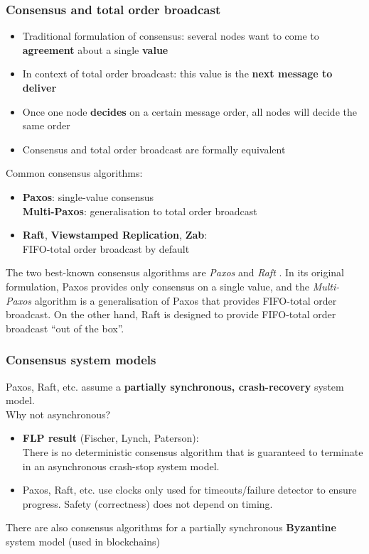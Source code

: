 \begin{frame}
    \label{s:consensus-intro}
    \frametitle{Consensus and total order broadcast}
    \begin{itemize}
        \item Traditional formulation of consensus: several nodes want to come to \textbf{agreement} about a single \textbf{value}\pause
        \item In context of total order broadcast: this value is the \textbf{next message to deliver}\pause
        \item Once one node \textbf{decides} on a certain message order, all nodes will decide the same order\pause
        \item Consensus and total order broadcast are formally equivalent\pause
    \end{itemize}
    Common consensus algorithms:
    \begin{itemize}
        \item \textbf{Paxos}: single-value consensus\\
            \textbf{Multi-Paxos}: generalisation to total order broadcast\pause
        \item \textbf{Raft}, \textbf{Viewstamped Replication}, \textbf{Zab}:\\
            FIFO-total order broadcast by default
    \end{itemize}
\end{frame}
\label{l:consensus-intro}

The two best-known consensus algorithms are \emph{Paxos} \citep{Lamport:1998} and \emph{Raft} \citep{Ongaro:2014}.
In its original formulation, Paxos provides only consensus on a single value, and the \emph{Multi-Paxos} algorithm is a generalisation of Paxos that provides FIFO-total order broadcast.
On the other hand, Raft is designed to provide FIFO-total order broadcast ``out of the box''.

\begin{frame}
    \label{s:consensus-model}
    \frametitle{Consensus system models}
    Paxos, Raft, etc. assume a \textbf{partially synchronous, crash-recovery} system model.\\[1em]\pause
    Why not asynchronous?
    \begin{itemize}
        \item \textbf{FLP result} (Fischer, Lynch, Paterson):\\
            There is no deterministic consensus algorithm that is guaranteed to terminate in an asynchronous crash-stop system model.\pause
        \item Paxos, Raft, etc. use clocks only used for timeouts/failure detector to ensure progress.
            Safety (correctness) does not depend on timing.\\[1em]\pause
    \end{itemize}
    There are also consensus algorithms for a partially synchronous \textbf{Byzantine} system model (used in blockchains)
\end{frame}
\label{l:consensus-model}


